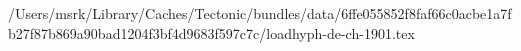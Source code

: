 /Users/msrk/Library/Caches/Tectonic/bundles/data/6ffe055852f8faf66c0acbe1a7fb27f87b869a90bad1204f3bf4d9683f597c7c/loadhyph-de-ch-1901.tex